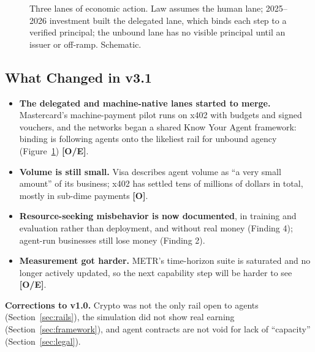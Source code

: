 \documentclass[11pt,letterpaper]{article}
\begin{document}
\begin{figure}[!htbp]
\caption{Three lanes of economic action. Law assumes the human lane; 2025--2026 investment built the delegated lane, which binds each step to a verified principal; the unbound lane has no visible principal until an issuer or off-ramp. Schematic.}
\label{fig:lanes}
\end{figure}

\subsection*{What Changed in v3.1}

\begin{itemize}
  \item \textbf{The delegated and machine-native lanes started to merge.} Mastercard's machine-payment pilot runs on x402 with budgets and signed vouchers, and the networks began a shared Know Your Agent framework: binding is following agents onto the likeliest rail for unbound agency (Figure~\ref{fig:lanes}) \textbf{[O/E]}.
  \item \textbf{Volume is still small.} Visa describes agent volume as ``a very small amount'' of its business; x402 has settled tens of millions of dollars in total, mostly in sub-dime payments \textbf{[O]}.
  \item \textbf{Resource-seeking misbehavior is now documented}, in training and evaluation rather than deployment, and without real money (Finding 4); agent-run businesses still lose money (Finding 2).
  \item \textbf{Measurement got harder.} METR's time-horizon suite is saturated and no longer actively updated, so the next capability step will be harder to see \textbf{[O/E]}.
\end{itemize}

\textbf{Corrections to v1.0.} Crypto was not the only rail open to agents (Section~\ref{sec:rails}), the simulation did not show real earning (Section~\ref{sec:framework}), and agent contracts are not void for lack of ``capacity'' (Section~\ref{sec:legal}).
\end{document}
